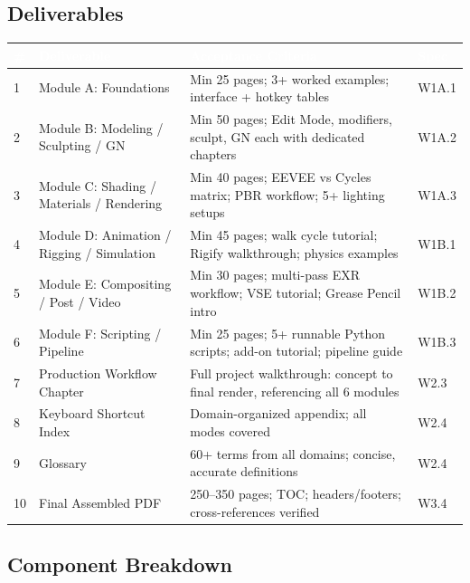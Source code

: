 \documentclass[11pt,letterpaper]{article}
\newcommand{\tableheader}[1]{\textbf{\sffamily\textcolor{white}{#1}}}
\begin{document}
\subsection{Deliverables}

\begin{center}
\begin{tabularx}{\textwidth}{C{0.5cm}L{4cm}XC{2.5cm}}
\toprule
{}
\tableheader{\#} & \tableheader{Deliverable} & \tableheader{Acceptance Criteria} & \tableheader{Spec} \\
 & Module A: Foundations & Min 25 pages; 3+ worked examples; interface + hotkey tables & W1A.1 \\
2 & Module B: Modeling / Sculpting / GN & Min 50 pages; Edit Mode, modifiers, sculpt, GN each with dedicated chapters & W1A.2 \\
3 & Module C: Shading / Materials / Rendering & Min 40 pages; EEVEE vs Cycles matrix; PBR workflow; 5+ lighting setups & W1A.3 \\
4 & Module D: Animation / Rigging / Simulation & Min 45 pages; walk cycle tutorial; Rigify walkthrough; physics examples & W1B.1 \\
5 & Module E: Compositing / Post / Video & Min 30 pages; multi-pass EXR workflow; VSE tutorial; Grease Pencil intro & W1B.2 \\
6 & Module F: Scripting / Pipeline & Min 25 pages; 5+ runnable Python scripts; add-on tutorial; pipeline guide & W1B.3 \\
7 & Production Workflow Chapter & Full project walkthrough: concept to final render, referencing all 6 modules & W2.3 \\
8 & Keyboard Shortcut Index & Domain-organized appendix; all modes covered & W2.4 \\
9 & Glossary & 60+ terms from all domains; concise, accurate definitions & W2.4 \\
10 & Final Assembled PDF & 250--350 pages; TOC; headers/footers; cross-references verified & W3.4 \\
\bottomrule
\end{tabularx}
\end{center}

\subsection{Component Breakdown}
\end{document}
